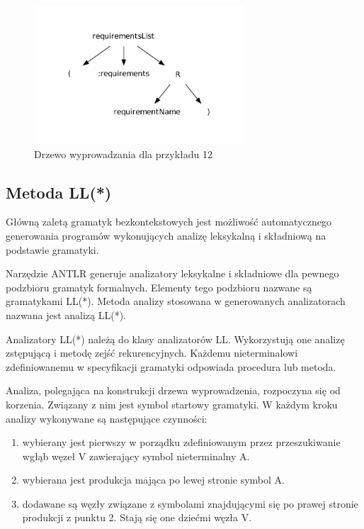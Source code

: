 \begin{figure}[h!]
  \centering
    \includegraphics[width=0.7\textwidth]{img/antlr_example.pdf}
    \caption{Drzewo wyprowadzania dla przykładu 12}
    \label{antlr_example}
\end{figure}

\subsection{Metoda LL(*)}
Główną zaletą gramatyk bezkontekstowych jest możliwość automatycznego generowania programów
wykonujących analizę leksykalną i składniową na podstawie gramatyki.

Narzędzie ANTLR generuje analizatory leksykalne i składniowe dla pewnego podzbioru
gramatyk formalnych. Elementy tego podzbioru nazwane są gramatykami LL(*). Metoda 
analizy stosowana w generowanych analizatorach nazwana jest analizą LL(*). 

Analizatory LL(*) należą do klasy analizatorów LL. Wykorzystują one
analizę zstępującą i metodę zejść 
rekurencyjnych. Każdemu nieterminalowi zdefiniowanemu w specyfikacji gramatyki
odpowiada procedura lub metoda. 

Analiza, polegająca na konstrukcji drzewa
wyprowadzenia, rozpoczyna się od korzenia. Związany z nim jest symbol 
startowy gramatyki. W każdym kroku analizy wykonywane są następujące czynności:
\begin{enumerate}
\item wybierany jest pierwszy w porządku zdefiniowanym przez
  przeszukiwanie wgłąb węzeł V zawierający symbol nieterminalny A.
\item wybierana jest produkcja mająca po lewej stronie symbol A.
\item dodawane są węzły związane z symbolami znajdującymi się po prawej
  stronie produkcji z punktu 2. Stają się one dziećmi węzła V.
\end{enumerate}

